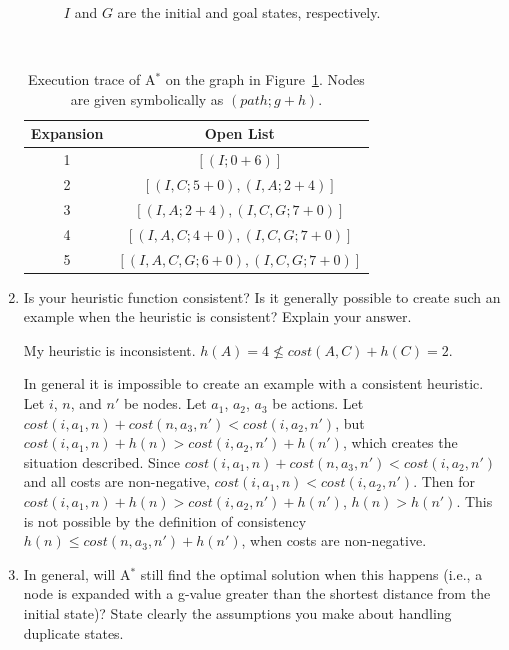 \documentclass[12pt]{article}
\newenvironment{problem}[2][Problem]{\begin{trivlist}
\item[\hskip \labelsep {\bfseries #1}\hskip \labelsep {\bfseries #2.}]}{\end{trivlist}}
\begin{document}
\begin{problem}{3}
\begin{enumerate}
\begin{figure}[h]
				\caption{$I$ and $G$ are the initial and goal states, respectively.}
				\label{fig:p3graph}
			\end{figure} \\
			\begin{table}[h]
				\centering
				\begin{tabular}{c|c}
					Expansion & Open List \\ %
					\hline
					1 & $[(I; 0+6)]$ \\
					2 & $[(I,C; 5+0), (I,A; 2+4)]$ \\
					3 & $[(I,A; 2+4), (I,C,G; 7+0)]$  \\
					4 & $[(I,A,C; 4+0), (I,C,G; 7+0)]$  \\
					5 & $[(I,A,C,G; 6+0), (I,C,G; 7+0)]$ \\
				\end{tabular}
				\caption{Execution trace of A$^*$ on the graph in Figure~\ref{fig:p3graph}. Nodes are given symbolically as $(path; g+h)$.}%
				\label{tbl:trace}
			\end{table}
		\item Is your heuristic function consistent? Is it generally possible to create such an example when the heuristic is consistent? Explain your answer.

			\vspace{0.25cm}
			My heuristic is inconsistent. $h(A) = 4 \nleq cost(A,C) + h(C) = 2$.
			
			In general it is impossible to create an example with a consistent heuristic.
			Let $i$, $n$, and $n'$ be nodes.
			Let $a_1$, $a_2$, $a_3$ be actions.
			Let $cost(i,a_1,n)+cost(n,a_3,n') < cost(i,a_2,n')$, but $cost(i,a_1,n)+h(n) > cost(i,a_2,n')+h(n')$,
			which creates the situation described.
			Since $cost(i,a_1,n)+cost(n,a_3,n') < cost(i,a_2,n')$ and all costs are non-negative,
			$cost(i,a_1,n) < cost(i,a_2,n')$.
			Then for $cost(i,a_1,n)+h(n) > cost(i,a_2,n')+h(n')$, $h(n) > h(n')$.
			This is not possible by the definition of consistency $h(n) \le cost(n,a_3,n')+h(n')$, when costs are non-negative.
		\item In general, will A$^*$ still find the optimal solution when this happens (i.e., a node is expanded with a g-value greater than the shortest distance from the initial state)?
			State clearly the assumptions you make about handling duplicate states.
			

\end{enumerate}
\end{problem}
\end{document}
